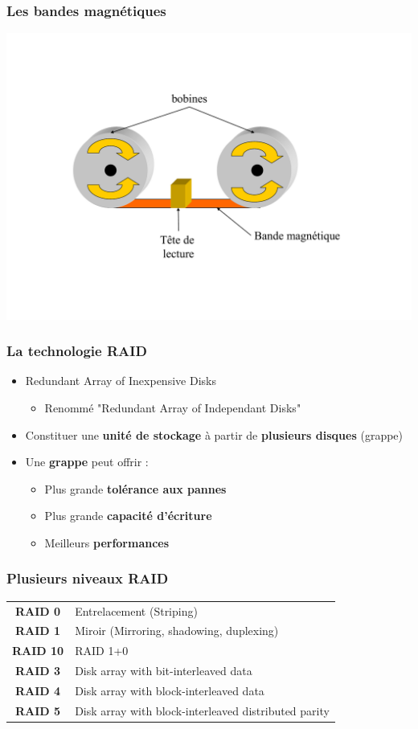 \begin{frame}
\frametitle{Les bandes magnétiques}
\begin{center}
\includegraphics[height=0.8\textheight]{../illustration/bande.pdf}
\end{center}
\end{frame}


\begin{frame}
\frametitle{La technologie RAID}
\begin{itemize}
\item Redundant Array of Inexpensive Disks
\begin{itemize}
\item Renommé "Redundant Array of Independant Disks"
\end{itemize}

\item Constituer une \textbf{unité de stockage} à partir de \textbf{plusieurs disques} (grappe)
\item Une \textbf{grappe} peut offrir :
\begin{itemize}
\item Plus grande \textbf{tolérance aux pannes}
\item Plus grande \textbf{capacité d'écriture}
\item Meilleurs \textbf{performances}
\end{itemize}
\end{itemize}
\end{frame}

\begin{frame}
\frametitle{Plusieurs niveaux RAID}
\begin{tabular}{c|l}
\textbf{RAID 0} & Entrelacement (Striping) \\
\textbf{RAID 1} & Miroir (Mirroring, shadowing, duplexing) \\
\textbf{RAID 10} & RAID 1+0 \\
\textbf{RAID 3} & Disk array with bit-interleaved data \\
\textbf{RAID 4} & Disk array with block-interleaved data \\
\textbf{RAID 5} & Disk array with block-interleaved distributed parity \\
\end{tabular}
\end{frame}


